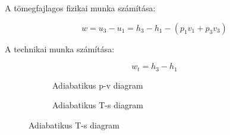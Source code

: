 A tömegfajlagos fizikai munka számítása:

\begin{equation*}
w = u_3-u_1 = h_3-h_1-(p_1v_1+p_3v_3)
\end{equation*}

A technikai munka számítása:

\begin{equation*}
w_t = h_3-h_1
\end{equation*}



\begin{figure}[h]
	\centering
	\begin{subfigure}[b]{0.545\textwidth} 
		\centering
		\begin{tikzpicture}
		
		
		
		\end{tikzpicture}
		\caption{Adiabatikus p-v diagram}
		
	\end{subfigure}
	\begin{subfigure}[b]{0.435\textwidth}
		\centering
		\begin{tikzpicture}
		
		
		
		\end{tikzpicture}
		\caption{Adiabatikus T-s diagram}
		
	\end{subfigure}
\end{figure}

\pagebreak